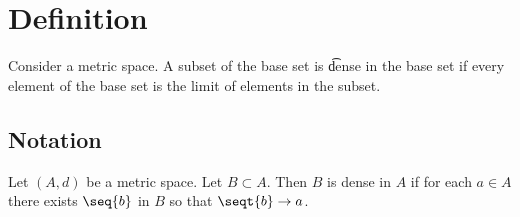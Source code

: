 
\section*{Definition}

Consider a metric space.
A subset of the base set is \t{dense} in the base set if every element of the base set is the limit of elements in the subset.

\subsection*{Notation}

Let $(A, d)$ be a metric space.
Let $B \subset A$.
Then $B$ is dense in $A$ if
for each $a \in A$ there exists
$\seq{b}$ in $B$ so that
$\seqt{b} \to a$.
